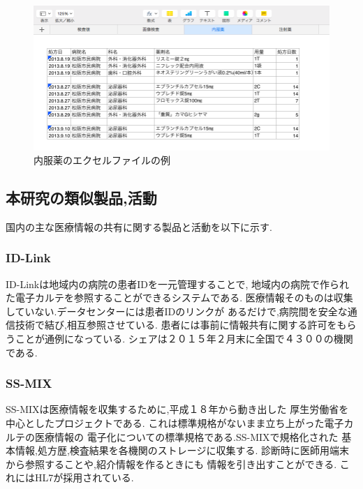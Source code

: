   \begin{figure}[htbp]
    \begin{center}
      \includegraphics[width=13cm, bb=0 0 850 411]{./gazou/excel-data-medicine.png}
    \end{center}
    \caption{内服薬のエクセルファイルの例}
    \label{excel-data-medicine}
  \end{figure}



\subsection{本研究の類似製品,活動}
  国内の主な医療情報の共有に関する製品と活動を以下に示す.



  \subsubsection{ID-Link}
    ID-Linkは地域内の病院の患者IDを一元管理することで,
    地域内の病院で作られた電子カルテを参照することができるシステムである.
    医療情報そのものは収集していない.データセンターには患者IDのリンクが
    あるだけで,病院間を安全な通信技術で結び,相互参照させている.
    患者には事前に情報共有に関する許可をもらうことが通例になっている.
    シェアは２０１５年２月末に全国で４３００の機関である.
    \cite{bibi12}

  \subsubsection{SS-MIX}
    SS-MIXは医療情報を収集するために,平成１８年から動き出した
    厚生労働省を中心としたプロジェクトである.
    これは標準規格がないまま立ち上がった電子カルテの医療情報の
    電子化についての標準規格である.SS-MIXで規格化された
    基本情報,処方歴,検査結果を各機関のストレージに収集する.
    診断時に医師用端末から参照することや,紹介情報を作るときにも
    情報を引き出すことができる.
    これにはHL7が採用されている.
    \cite{bibi7}

